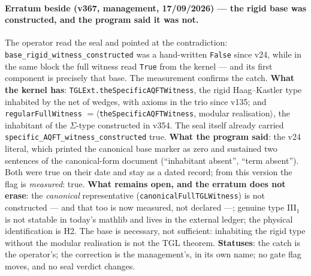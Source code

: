 \documentclass[11pt]{article}
\theoremstyle{definition}\newtheorem{deriv}{Derivation}
\begin{document}
\paragraph*{Erratum beside (v367, management, 17/09/2026) --- the rigid base was constructed, and the program said it was not.} The operator read the seal and pointed at the contradiction: \texttt{base\_rigid\_witness\_constructed} was a hand-written \texttt{False} since v24, while in the same block the full witness read \texttt{True} from the kernel --- and its first component is precisely that base. The measurement confirms the catch. \textbf{What the kernel has}: \texttt{TGLExt.theSpecificAQFTWitness}, the rigid Haag--Kastler type inhabited by the net of wedges, with axioms in the trio since v135; and \texttt{regularFullWitness} $=\langle$\texttt{theSpecificAQFTWitness}, modular realisation$\rangle$, the inhabitant of the $\Sigma$-type constructed in v354. The seal itself already carried \texttt{specific\_AQFT\_witness\_constructed} true. \textbf{What the program said}: the v24 literal, which printed the canonical base marker as zero and sustained two sentences of the canonical-form document (``inhabitant absent'', ``term absent''). Both were true on their date and stay as a dated record; from this version the flag is \emph{measured}: true. \textbf{What remains open, and the erratum does not erase}: the \emph{canonical} representative (\texttt{canonicalFullTGLWitness}) is not constructed --- and that too is now measured, not declared ---; genuine type III$_1$ is not statable in today's mathlib and lives in the external ledger; the physical identification is H2. The base is necessary, not sufficient: inhabiting the rigid type without the modular realisation is not the TGL theorem. \textbf{Statuses}: the catch is the operator's; the correction is the management's, in its own name; no gate flag moves, and no seal verdict changes.
\end{document}
